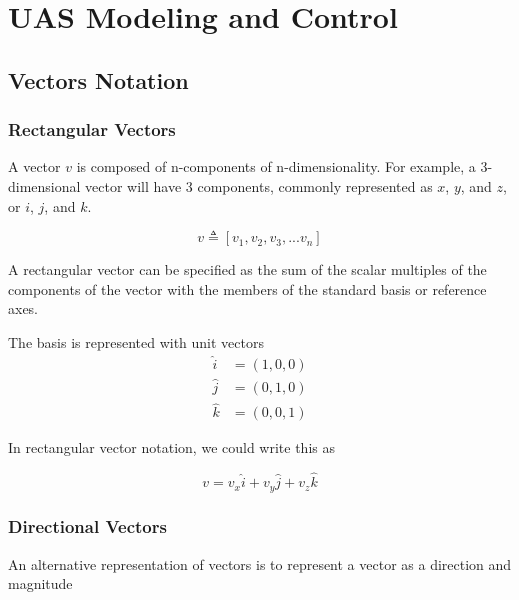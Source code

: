\documentclass[
]{book}
\theoremstyle{definition}
\theoremstyle{definition}
\theoremstyle{definition}
\theoremstyle{definition}
\theoremstyle{remark}
\begin{document}
\hypertarget{part-uas-modeling-and-control}{%
\part{UAS Modeling and Control}\label{part-uas-modeling-and-control}}

\hypertarget{vectors-notation}{%
\chapter{Vectors Notation}\label{vectors-notation}}

\hypertarget{rectangular-vectors}{%
\section{Rectangular Vectors}\label{rectangular-vectors}}

A vector \(v\) is composed of n-components of n-dimensionality. For example, a 3-dimensional vector will have 3 components, commonly represented as \(x\), \(y\), and \(z\), or \(i\), \(j\), and \(k\).

\[ v \triangleq [v_1, v_2, v_3, ... v_n]\]

A rectangular vector can be specified as the sum of the scalar multiples of the components of the vector with the members of the standard basis or reference axes.

The basis is represented with unit vectors
\begin{equation} 
\begin{split}
\hat{i} & =(1,0,0)\\
\hat{j} & =(0,1,0)\\
\hat{k} & =(0,0,1)
\end{split}
\label{eq:basis}
\end{equation}

In rectangular vector notation, we could write this as

\begin{equation}
v = v_x\hat{i}+v_y\hat{j}+v_z\hat{k}
\label{eq:rect}
\end{equation}

\hypertarget{directional-vectors}{%
\section{Directional Vectors}\label{directional-vectors}}

An alternative representation of vectors is to represent a vector as a direction and magnitude
\end{document}
